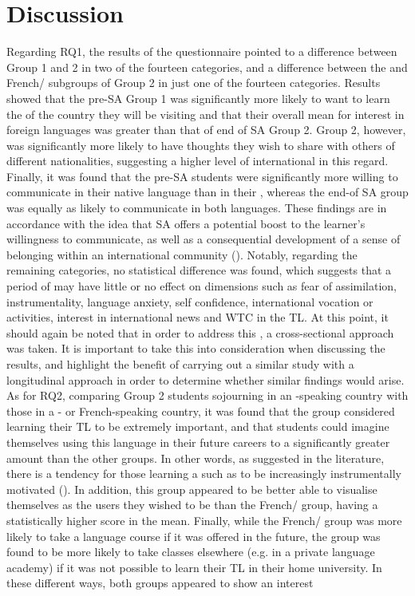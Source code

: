 \documentclass[output=paper]{langsci/langscibook}
\begin{document}
\section{Discussion}

Regarding RQ1, the results of the questionnaire pointed to a difference between Group 1 and 2 in two of the fourteen categories, and a difference between the  and French/ subgroups of Group 2 in just one of the fourteen categories. Results showed that the pre-SA Group 1 was significantly more likely to want to learn the  of the country they will be visiting and that their overall mean for interest in foreign languages was greater than that of end of SA Group 2. Group 2, however, was significantly more likely to have thoughts they wish to share with others of different nationalities, suggesting a higher level of international  in this regard. Finally, it was found that the pre-SA students were significantly more willing to communicate in their native language than in their , whereas the end-of SA group was equally as likely to communicate in both languages. These findings are in accordance with the idea that SA offers a potential boost to the learner’s willingness to communicate, as well as a consequential development of a sense of belonging within an international community (\citealt{Juan-GarauEtAl2014}). Notably, regarding the remaining categories, no statistical difference was found, which suggests that a period of  may have little or no effect on dimensions such as fear of assimilation, instrumentality, language anxiety,  self confidence, international vocation or activities, interest in international news and WTC in the TL. At this point, it should again be noted that in order to address this , a cross-sectional approach was taken. It is important to take this into consideration when discussing the results, and highlight the benefit of carrying out a similar study with a longitudinal approach in order to determine whether similar findings would arise. As for RQ2, comparing Group 2 students sojourning in an -speaking country with those in a - or French-speaking country, it was found that the  group considered learning their TL to be extremely important, and that students could imagine themselves using this language in their future careers to a significantly greater amount than the other groups. In other words, as suggested in the literature, there is a tendency for those learning a  such as  to be increasingly instrumentally motivated (\citealt{BlockCameron2002}). In addition, this group appeared to be better able to visualise themselves as the  users they wished to be than the French/ group, having a statistically higher score in the  mean. Finally, while the French/ group was more likely to take a language course if it was offered in the future, the  group was found to be more likely to take classes elsewhere (e.g. in a private language academy) if it was not possible to learn their TL in their home university. In these different ways, both groups appeared to show an interest 
\end{document}
